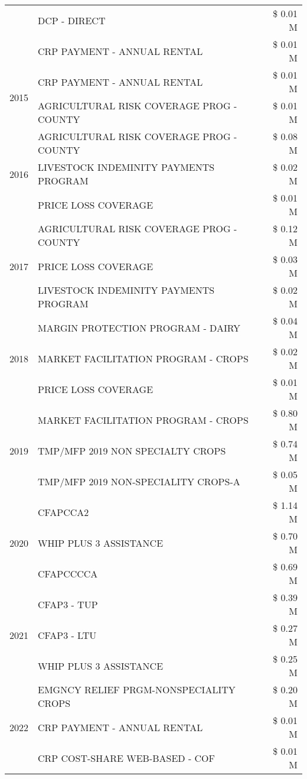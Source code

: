 \begin{tabular}{llr}
 & DCP - DIRECT & \$ 0.01 M \\
 & CRP PAYMENT - ANNUAL RENTAL & \$ 0.01 M \\
\cline{1-3}
\multirow[t]{2}{*}{2015} & CRP PAYMENT - ANNUAL RENTAL & \$ 0.01 M \\
 & AGRICULTURAL RISK COVERAGE PROG - COUNTY & \$ 0.01 M \\
\cline{1-3}
\multirow[t]{3}{*}{2016} & AGRICULTURAL RISK COVERAGE PROG - COUNTY & \$ 0.08 M \\
 & LIVESTOCK INDEMINITY PAYMENTS PROGRAM & \$ 0.02 M \\
 & PRICE LOSS COVERAGE & \$ 0.01 M \\
\cline{1-3}
\multirow[t]{3}{*}{2017} & AGRICULTURAL RISK COVERAGE PROG - COUNTY & \$ 0.12 M \\
 & PRICE LOSS COVERAGE & \$ 0.03 M \\
 & LIVESTOCK INDEMINITY PAYMENTS PROGRAM & \$ 0.02 M \\
\cline{1-3}
\multirow[t]{3}{*}{2018} & MARGIN PROTECTION PROGRAM - DAIRY & \$ 0.04 M \\
 & MARKET FACILITATION PROGRAM - CROPS & \$ 0.02 M \\
 & PRICE LOSS COVERAGE & \$ 0.01 M \\
\cline{1-3}
\multirow[t]{3}{*}{2019} & MARKET FACILITATION PROGRAM - CROPS & \$ 0.80 M \\
 & TMP/MFP 2019 NON SPECIALTY CROPS & \$ 0.74 M \\
 & TMP/MFP 2019 NON-SPECIALITY CROPS-A & \$ 0.05 M \\
\cline{1-3}
\multirow[t]{3}{*}{2020} & CFAPCCA2 & \$ 1.14 M \\
 & WHIP PLUS 3 ASSISTANCE & \$ 0.70 M \\
 & CFAPCCCCA & \$ 0.69 M \\
\cline{1-3}
\multirow[t]{3}{*}{2021} & CFAP3 - TUP & \$ 0.39 M \\
 & CFAP3 - LTU & \$ 0.27 M \\
 & WHIP PLUS 3 ASSISTANCE & \$ 0.25 M \\
\cline{1-3}
\multirow[t]{3}{*}{2022} & EMGNCY RELIEF PRGM-NONSPECIALITY CROPS & \$ 0.20 M \\
 & CRP PAYMENT - ANNUAL RENTAL & \$ 0.01 M \\
 & CRP COST-SHARE WEB-BASED - COF & \$ 0.01 M \\
\cline{1-3}
\bottomrule
\end{tabular}
